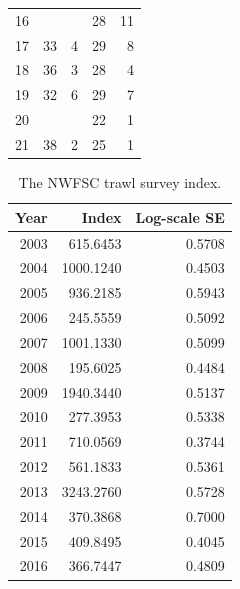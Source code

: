 \documentclass[12pt,]{article}
\begin{document}
\begin{table}[ht]
\begin{tabular}{rrrrr}
  16 &  &  & 28 & 11 \\ 
  17 & 33 & 4 & 29 & 8 \\ 
  18 & 36 & 3 & 28 & 4 \\ 
  19 & 32 & 6 & 29 & 7 \\ 
  20 &  &  & 22 & 1 \\ 
  21 & 38 & 2 & 25 & 1 \\ 
   \hline
\end{tabular}
\end{table}\begin{table}[ht]
\centering
\caption{The NWFSC trawl survey
                                            index.} 
\label{tab:Fleet8_NWFSCTrawl_index}
\begin{tabular}{rrr}
  \hline
Year & Index & Log-scale SE \\ 
  \hline
 2003 & 615.6453 & 0.5708 \\ 
   2004 & 1000.1240 & 0.4503 \\ 
   2005 & 936.2185 & 0.5943 \\ 
   2006 & 245.5559 & 0.5092 \\ 
   2007 & 1001.1330 & 0.5099 \\ 
   2008 & 195.6025 & 0.4484 \\ 
   2009 & 1940.3440 & 0.5137 \\ 
   2010 & 277.3953 & 0.5338 \\ 
   2011 & 710.0569 & 0.3744 \\ 
   2012 & 561.1833 & 0.5361 \\ 
   2013 & 3243.2760 & 0.5728 \\ 
   2014 & 370.3868 & 0.7000 \\ 
   2015 & 409.8495 & 0.4045 \\ 
   2016 & 366.7447 & 0.4809 \\ 
   \hline
\end{tabular}
\end{table}

\FloatBarrier

\vspace{2in}
\end{document}

